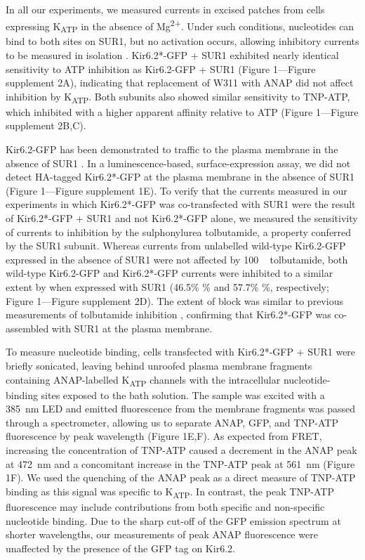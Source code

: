 \documentclass[9pt,lineno, onehalfspacing]{elife_modified}
\begin{document}
In all our experiments, we measured currents in excised patches from cells expressing K\textsubscript{ATP} in the absence of Mg\textsuperscript{2+}.
Under such conditions, nucleotides can bind to both sites on SUR1, but no activation occurs, allowing inhibitory currents to be measured in isolation \citep{RN82, RN60, RN80}.
Kir6.2*-GFP + SUR1 exhibited nearly identical sensitivity to ATP inhibition as Kir6.2-GFP + SUR1 (Figure 1—Figure supplement 2A), indicating that replacement of W311 with ANAP did not affect inhibition by K\textsubscript{ATP}.
Both subunits also showed similar sensitivity to TNP-ATP, which inhibited with a higher apparent affinity relative to ATP (Figure 1—Figure supplement 2B,C).

Kir6.2-GFP has been demonstrated to traffic to the plasma membrane in the absence of SUR1 \citep{RN86, RN48}.
In a luminescence-based, surface-expression assay, we did not detect HA-tagged Kir6.2*-GFP at the plasma membrane in the absence of SUR1 (Figure 1—Figure supplement 1E).
To verify that the currents measured in our experiments in which Kir6.2*-GFP was co-transfected with SUR1 were the result of Kir6.2*-GFP + SUR1 and not Kir6.2*-GFP alone, we measured the sensitivity of currents to inhibition by the sulphonylurea tolbutamide, a property conferred by the SUR1 subunit.
Whereas currents from unlabelled wild-type Kir6.2-GFP expressed in the absence of SUR1 were not affected by 100 \si{\micro\Molar} tolbutamide, both wild-type Kir6.2-GFP and Kir6.2*-GFP currents were inhibited to a similar extent by when expressed with SUR1 (46.5\% \% and 57.7\% \%, respectively; Figure 1—Figure supplement 2D).
The extent of block was similar to previous measurements of tolbutamide inhibition \citep{RN10}, confirming that Kir6.2*-GFP was co-assembled with SUR1 at the plasma membrane.

To measure nucleotide binding, cells transfected with Kir6.2*-GFP + SUR1 were briefly sonicated, leaving behind unroofed plasma membrane fragments \citep{RN21, RN22, RN80} containing ANAP-labelled K\textsubscript{ATP} channels with the intracellular nucleotide-binding sites exposed to the bath solution.
The sample was excited with a \SI{385}{\nano\metre} LED and emitted fluorescence from the membrane fragments was passed through a spectrometer, allowing us to separate ANAP, GFP, and TNP-ATP fluorescence by peak wavelength (Figure 1E,F).
As expected from FRET, increasing the concentration of TNP-ATP caused a decrement in the ANAP peak at \SI{472}{\nano\metre} and a concomitant increase in the TNP-ATP peak at \SI{561}{\nano\metre} (Figure 1F).
We used the quenching of the ANAP peak as a direct measure of TNP-ATP binding as this signal was specific to K\textsubscript{ATP}.
In contrast, the peak TNP-ATP fluorescence may include contributions from both specific and non-specific nucleotide binding.
Due to the sharp cut-off of the GFP emission spectrum at shorter wavelengths, our measurements of peak ANAP fluorescence were unaffected by the presence of the GFP tag on Kir6.2.
\end{document}
